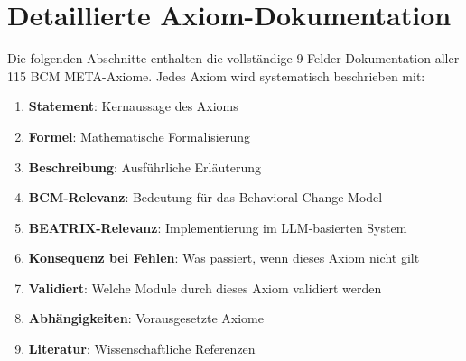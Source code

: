 \documentclass[11pt,a4paper]{article}
\theoremstyle{definition}
\theoremstyle{plain}
\begin{document}



\section{Detaillierte Axiom-Dokumentation}

Die folgenden Abschnitte enthalten die vollständige 9-Felder-Dokumentation aller 115 BCM META-Axiome. Jedes Axiom wird systematisch beschrieben mit:

\begin{enumerate}
    \item \textbf{Statement}: Kernaussage des Axioms
    \item \textbf{Formel}: Mathematische Formalisierung
    \item \textbf{Beschreibung}: Ausführliche Erläuterung
    \item \textbf{BCM-Relevanz}: Bedeutung für das Behavioral Change Model
    \item \textbf{BEATRIX-Relevanz}: Implementierung im LLM-basierten System
    \item \textbf{Konsequenz bei Fehlen}: Was passiert, wenn dieses Axiom nicht gilt
    \item \textbf{Validiert}: Welche Module durch dieses Axiom validiert werden
    \item \textbf{Abhängigkeiten}: Vorausgesetzte Axiome
    \item \textbf{Literatur}: Wissenschaftliche Referenzen
\end{enumerate}





\end{document}
